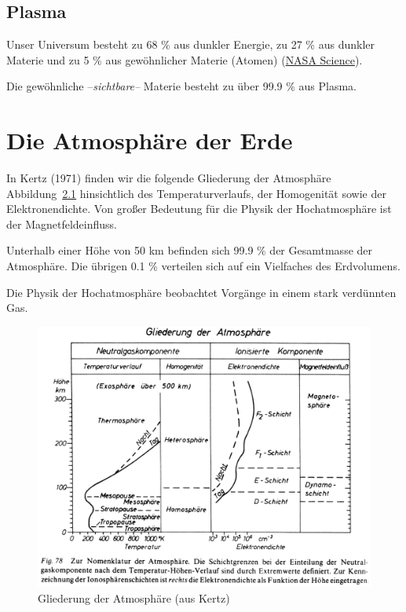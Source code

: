 \documentclass[
  a4paper,
  DIV=11]{scrreprt}
\begin{document}
\hypertarget{plasma}{%
\section{Plasma}\label{plasma}}

Unser Universum besteht zu 68 \% aus dunkler Energie, zu 27 \% aus
dunkler Materie und zu 5 \% aus gewöhnlicher Materie (Atomen)
(\href{https://science.nasa.gov/astrophysics/focus-areas/what-is-dark-energy/}{NASA
Science}).

Die gewöhnliche --\emph{sichtbare--} Materie besteht zu über 99.9 \% aus
Plasma.

\hypertarget{die-atmosphuxe4re-der-erde}{%
\chapter{Die Atmosphäre der Erde}\label{die-atmosphuxe4re-der-erde}}

In Kertz (1971) finden wir die folgende Gliederung der Atmosphäre
Abbildung~\ref{fig-kertz} hinsichtlich des Temperaturverlaufs, der
Homogenität sowie der Elektronendichte. Von großer Bedeutung für die
Physik der Hochatmosphäre ist der Magnetfeldeinfluss.

Unterhalb einer Höhe von 50 km befinden sich 99.9 \% der Gesamtmasse der
Atmosphäre. Die übrigen 0.1 \% verteilen sich auf ein Vielfaches des
Erdvolumens.

Die Physik der Hochatmosphäre beobachtet Vorgänge in einem stark
verdünnten Gas.

\begin{figure}

{\centering \includegraphics{./images/paste-CCE7768B.png}

}

\caption{\label{fig-kertz}Gliederung der Atmosphäre (aus Kertz)}

\end{figure}
\end{document}
